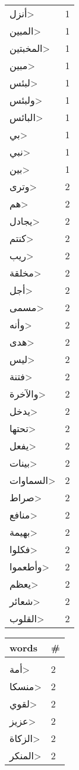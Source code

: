 \documentclass{article}
\begin{document}
\begin{multicols}{6}
\begin{center}
\begin{tabular}{ P{2cm}  P{1cm}}
\<أنزل> & 1 \\ 
\<المبين> & 1 \\ 
\<المخبتين> & 1 \\ 
\<مبين> & 1 \\ 
\<لبئس> & 1 \\ 
\<ولبئس> & 1 \\ 
\<البائس> & 1 \\ 
\<بي> & 1 \\ 
\<نبي> & 1 \\ 
\<بين> & 1 \\ 
\<وترى> & 2 \\ 
\<هم> & 2 \\ 
\<يجادل> & 2 \\ 
\<كنتم> & 2 \\ 
\<ريب> & 2 \\ 
\<مخلقة> & 2 \\ 
\<أجل> & 2 \\ 
\<مسمى> & 2 \\ 
\<وأنه> & 2 \\ 
\<هدى> & 2 \\ 
\<ليس> & 2 \\ 
\<فتنة> & 2 \\ 
\<والآخرة> & 2 \\ 
\<يدخل> & 2 \\ 
\<تحتها> & 2 \\ 
\<يفعل> & 2 \\ 
\<بينات> & 2 \\ 
\<السماوات> & 2 \\ 
\<صراط> & 2 \\ 
\<منافع> & 2 \\ 
\<بهيمة> & 2 \\ 
\<فكلوا> & 2 \\ 
\<وأطعموا> & 2 \\ 
\<يعظم> & 2 \\ 
\<شعائر> & 2 \\ 
\<القلوب> & 2 \\ 
\end{tabular} 
\begin{tabular}{ P{2cm}  P{1cm}} 
\textbf{words}    & \textbf{\#}  \\
\hline
\\[0.01cm]
\<أمة> & 2 \\ 
\<منسكا> & 2 \\ 
\<لقوي> & 2 \\ 
\<عزيز> & 2 \\ 
\<الزكاة> & 2 \\ 
\<المنكر> & 2 \\ 

\end{tabular}
\end{center}
\end{multicols}
\end{document}

